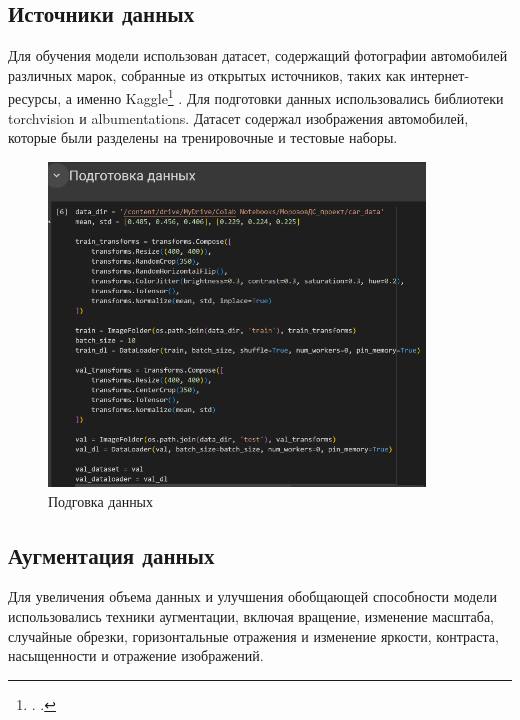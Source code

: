 \documentclass[14pt]{extarticle}
\begin{document}
\subsection{Источники данных}
\hspace{1cm}Для обучения модели использован датасет, содержащий фотографии автомобилей различных марок, собранные из открытых источников, таких как интернет-ресурсы, а именно Kaggle\footnote{\citeauthor{stanfordcars}. \emph{}.}
. Для подготовки данных использовались библиотеки torchvision и albumentations. Датасет содержал изображения автомобилей, которые были разделены на тренировочные и тестовые наборы.
\begin{figure}[H]
    \centering
    \includegraphics[width=10cm]{images/1.png}
    \caption{Подговка данных}
    \label{fig:10}
\end{figure}

\subsection{Аугментация данных}
\hspace{1cm}Для увеличения объема данных и улучшения обобщающей способности модели использовались техники аугментации, включая вращение, изменение масштаба, случайные обрезки, горизонтальные отражения и изменение яркости, контраста, насыщенности и отражение изображений.
\end{document}

